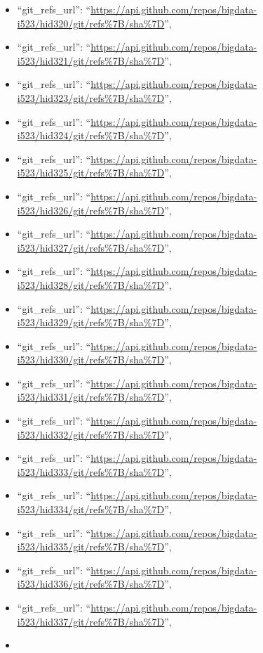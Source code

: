 \begin{itemize}
\item
  ``git\_refs\_url'':
  ``\url{https://api.github.com/repos/bigdata-i523/hid320/git/refs\%7B/sha\%7D}'',
\item
  ``git\_refs\_url'':
  ``\url{https://api.github.com/repos/bigdata-i523/hid321/git/refs\%7B/sha\%7D}'',
\item
  ``git\_refs\_url'':
  ``\url{https://api.github.com/repos/bigdata-i523/hid323/git/refs\%7B/sha\%7D}'',
\item
  ``git\_refs\_url'':
  ``\url{https://api.github.com/repos/bigdata-i523/hid324/git/refs\%7B/sha\%7D}'',
\item
  ``git\_refs\_url'':
  ``\url{https://api.github.com/repos/bigdata-i523/hid325/git/refs\%7B/sha\%7D}'',
\item
  ``git\_refs\_url'':
  ``\url{https://api.github.com/repos/bigdata-i523/hid326/git/refs\%7B/sha\%7D}'',
\item
  ``git\_refs\_url'':
  ``\url{https://api.github.com/repos/bigdata-i523/hid327/git/refs\%7B/sha\%7D}'',
\item
  ``git\_refs\_url'':
  ``\url{https://api.github.com/repos/bigdata-i523/hid328/git/refs\%7B/sha\%7D}'',
\item
  ``git\_refs\_url'':
  ``\url{https://api.github.com/repos/bigdata-i523/hid329/git/refs\%7B/sha\%7D}'',
\item
  ``git\_refs\_url'':
  ``\url{https://api.github.com/repos/bigdata-i523/hid330/git/refs\%7B/sha\%7D}'',
\item
  ``git\_refs\_url'':
  ``\url{https://api.github.com/repos/bigdata-i523/hid331/git/refs\%7B/sha\%7D}'',
\item
  ``git\_refs\_url'':
  ``\url{https://api.github.com/repos/bigdata-i523/hid332/git/refs\%7B/sha\%7D}'',
\item
  ``git\_refs\_url'':
  ``\url{https://api.github.com/repos/bigdata-i523/hid333/git/refs\%7B/sha\%7D}'',
\item
  ``git\_refs\_url'':
  ``\url{https://api.github.com/repos/bigdata-i523/hid334/git/refs\%7B/sha\%7D}'',
\item
  ``git\_refs\_url'':
  ``\url{https://api.github.com/repos/bigdata-i523/hid335/git/refs\%7B/sha\%7D}'',
\item
  ``git\_refs\_url'':
  ``\url{https://api.github.com/repos/bigdata-i523/hid336/git/refs\%7B/sha\%7D}'',
\item
  ``git\_refs\_url'':
  ``\url{https://api.github.com/repos/bigdata-i523/hid337/git/refs\%7B/sha\%7D}'',
\item

\end{itemize}
